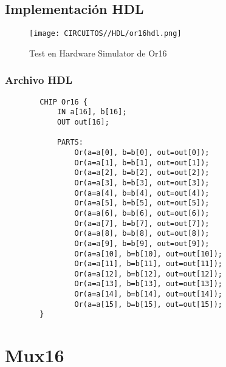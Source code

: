 \documentclass[12pt]{article}
\begin{document}
    \subsection{Implementación HDL}
        \begin{figure}[H]
            \centering
            \texttt{[image: CIRCUITOS//HDL/or16hdl.png]}
            \caption{Test en Hardware Simulator de Or16 \cite{nand2tetris}}
            \label{fig:hdlor16}
        \end{figure}
        \subsubsection{Archivo HDL}
            \begin{lstlisting}
        CHIP Or16 {
            IN a[16], b[16];
            OUT out[16];
        
            PARTS:
                Or(a=a[0], b=b[0], out=out[0]);
                Or(a=a[1], b=b[1], out=out[1]);
                Or(a=a[2], b=b[2], out=out[2]);
                Or(a=a[3], b=b[3], out=out[3]);
                Or(a=a[4], b=b[4], out=out[4]);
                Or(a=a[5], b=b[5], out=out[5]);
                Or(a=a[6], b=b[6], out=out[6]);
                Or(a=a[7], b=b[7], out=out[7]);
                Or(a=a[8], b=b[8], out=out[8]);
                Or(a=a[9], b=b[9], out=out[9]);
                Or(a=a[10], b=b[10], out=out[10]);
                Or(a=a[11], b=b[11], out=out[11]);
                Or(a=a[12], b=b[12], out=out[12]);
                Or(a=a[13], b=b[13], out=out[13]);
                Or(a=a[14], b=b[14], out=out[14]);
                Or(a=a[15], b=b[15], out=out[15]);
        }
            \end{lstlisting}  
    \newpage


\section{Mux16}
\end{document}

